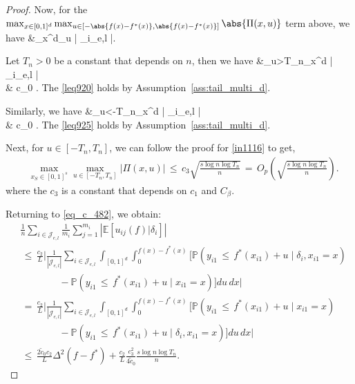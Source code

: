 \documentclass[twoside,11pt]{article}
\begin{document}
\begin{proof}
Now, for the $\max_{x\in[0,1]^d}\max_{u \in [-\abs{f(x) - f^*(x)}, \abs{f(x) - f^*(x)}]} \abs{\Pi(x,u)}$ term above, we have
\bea
&\max_{x\in [0,1]^d}\max_{u} \bigg|  \sum_{i\in {}_{e,l}} \bigg[ \mathbb{P}(y_{i1} \,\leq\, f^*(x_{i1}) + u\mid x_{i1} = x) \\
&\quad - \mathbb{P}(y_{i1} \,\leq\, f^*(x_{i1}) + u \mid \delta_i, x_{i1} = x) \bigg] \bigg|.
\bea

Let $T_n > 0$ be a constant that depends on $n$, then we have 
\bea 
&\max_{u>T_n}\max_{x\in [0,1]^d} \left|  \sum_{i\in {}_{e,l}} \left[\mathbb{P}(\delta_{i}(x_{i1}) + e_{i1} \,\leq\, u \mid \delta_i, x_{i1} = x) - \mathbb{P}( \delta_{i}(x_{i1}) + e_{i1} \,\leq\, u\mid x_{i1} = x)\right] \right| \\
& \tilde c_0 .
\bea 
The \eqref{leq920} holds by Assumption~\ref{ass:tail_multi_d}.


Similarly, we have 
\bea 
&\max_{u<-T_n}\max_{x\in [0,1]^d} \left|  \sum_{i\in {}_{e,l}} \left[\mathbb{P}(\delta_{i}(x_{i1}) + e_{i1} \,\leq\, u \mid \delta_i, x_{i1} = x) - \mathbb{P}( \delta_{i}(x_{i1}) + e_{i1} \,\leq\, u\mid x_{i1} = x)\right] \right| \\
& \tilde c_0 .
\bea 
The \eqref{leq925} holds by Assumption~\ref{ass:tail_multi_d}.



Next, for $u \in [-T_n, T_n]$, we can follow the proof for \eqref{in1116} to get, 
\begin{align*}
    &\max_{x_S \in [0,1]^s} \max_{u \in [-T_n, T_n]} |\Pi(x,u)| \,\leq\, c_3\sqrt{\frac{s\log n \log T_n}{n}} \,=\, O_p \left(\sqrt{\frac{s\log n\log T_n}{n}}\right).
\end{align*}
where the $c_3$ is a constant that depends on $c_1$ and $C_{\beta}$. 


Returning to \eqref{eq_c_482}, we obtain:
\begin{align*}
    &\frac{1}{n}\sum_{i \in \mathcal{J}_{e,l}} \frac{1}{m_i}\sum_{j=1}^{m_{i}}\left|\mathbb{E}[u_{ij}(f)|\delta_i]\right| \\
    &\,\leq\, \frac{c_2}{L}\bigg| \frac{1}{|\mathcal{J}_{e,l}|} \sum_{i\in \mathcal{J}_{e,l}} \int_{[0,1]^d}\int_0^{f(x) - f^*(x)} \Big[ \mathbb{P}(y_{i1} \,\leq\, f^*(x_{i1}) + u \mid \delta_i, x_{i1}=x) \\
    &\qquad\qquad - \mathbb{P}(y_{i1} \,\leq\, f^*(x_{i1}) + u \mid x_{i1} = x) \Big] du \, dx \bigg| \\
    &\,=\, \frac{c_2}{L}\bigg| \frac{1}{|\mathcal{J}_{e,l}|} \sum_{i\in \mathcal{J}_{e,l}} \int_{[0,1]^d}\int_0^{f(x) - f^*(x)} \Big[ \mathbb{P}(y_{i1} \,\leq\, f^*(x_{i1}) + u \mid x_{i1}=x) \\
    &\qquad\qquad - \mathbb{P}(y_{i1} \,\leq\, f^*(x_{i1}) + u \mid \delta_i, x_{i1} = x) \Big] du \, dx \bigg| \\
&\,\leq\, \frac{2\tilde c_0c_2}{L}  \Delta^2(f-f^*)+ \frac{c_2}{L}\frac{c_3^2}{4\tilde c_0}\frac{s\log n\log T_n}{n}.
\end{align*}


\end{proof}
\end{document}
